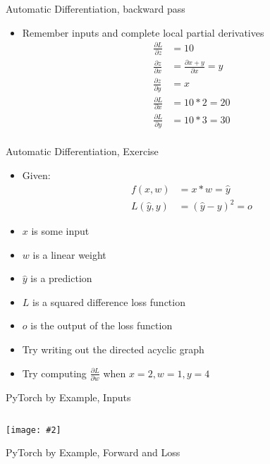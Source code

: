 \documentclass[hyperref={pdfpagelabels=false},12pt]{beamer}
\newcommand{\ig}[2]{\texttt{[image: \#2]}}
\newcommand{\pygment}[3]{\inputminted[bgcolor=lightgray,linenos,fontsize=#1]{#2}{#3}}
\begin{document}
\begin{frame}{Automatic Differentiation, backward pass}
  \begin{itemize}
    \item Remember inputs and complete local partial derivatives
      \begin{align*}
        \frac{\partial L}{\partial z} &= 10 \\
        \frac{\partial z}{\partial x} &= \frac{\partial x + y}{\partial x} = y \\
        \frac{\partial z}{\partial y} &= x \\
        \frac{\partial L}{\partial x} &= 10 * 2 = 20 \\
        \frac{\partial L}{\partial y} &= 10 * 3 = 30 \\
      \end{align*}
  \end{itemize}
\end{frame}

\begin{frame}{Automatic Differentiation, Exercise}
  \begin{itemize}
      \item Given:
        \begin{align*}
          f(x, w) &= x * w = \hat{y} \\
          L(\hat{y}, y) &= (\hat{y} - y)^2 = o
        \end{align*}
      \item $x$ is some input
      \item $w$ is a linear weight
      \item $\hat{y}$ is a prediction
      \item $L$ is a squared difference loss function
      \item $o$ is the output of the loss function
      \item Try writing out the directed acyclic graph
      \item Try computing $\frac{\partial L}{\partial w}$ when $x=2, w=1, y=4$
  \end{itemize}
\end{frame}

\begin{frame}{PyTorch by Example, Inputs}
  \centering
  \pygment{\scriptsize}{python}{code/basic-training.0.py}
  \ig{0.5}{figures/2x.png}
\end{frame}

\begin{frame}{PyTorch by Example, Forward and Loss}
  \pygment{\scriptsize}{python}{code/basic-training.1.py}
\end{frame}
\end{document}
